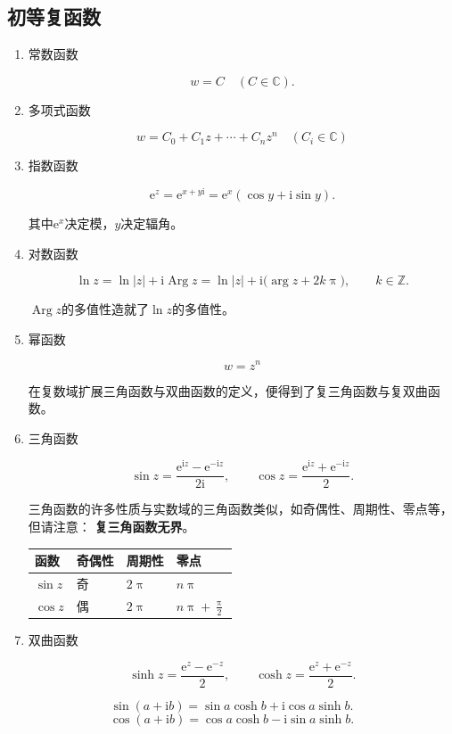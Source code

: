 \documentclass[UTF8,fontset=fandol,zihao=5]{ctexart}
\newcommand{\ii}{\mathrm{i}}
\newcommand{\ee}{\mathrm{e}}
\newcommand{\CC}{\mathbb{C}}
\begin{document}
\subsection{初等复函数}
\begin{enumerate}
  \item 常数函数

\[
  w=C\quad(C\in\CC).
\]

  \item 多项式函数

\[
  w=C_0+C_1z+\cdots+C_nz^n\quad(C_i\in\CC)
\]

  \item 指数函数  

\[
  \ee^z=\ee^{x+y\ii}=\ee^x(\cos y+\ii\sin y).
\]

其中$\ee^x$决定模，$y$决定辐角。

  \item 对数函数  

\[
\ln z
=\ln|z|+\ii\operatorname{Arg}z
=\ln|z|+\ii\bigl(\arg z+2k\uppi\bigr),
\qquad k\in\mathbb Z.
\]

$\operatorname{Arg}z$的多值性造就了$\ln z$的多值性。
  
  \item 幂函数  

\[
  w=z^n
\]

在复数域扩展三角函数与双曲函数的定义，便得到了复三角函数与复双曲函数。

  \item 三角函数  

\[
  \sin z=\frac{\ee^{\ii z}-\ee^{-\ii z}}{2\ii},
  \qquad
  \cos z=\frac{\ee^{\ii z}+\ee^{-\ii z}}{2}.
\]

三角函数的许多性质与实数域的三角函数类似，如奇偶性、周期性、零点等，但请注意：
\textbf{复三角函数无界}。

\begin{center}
\begin{tabularx}{0.88\textwidth}{>{\bfseries}p{2.2cm}X X X}
\toprule
函数 & 奇偶性 & 周期性 & 零点 \\
\midrule
\(\sin z\) & 奇 & $2\uppi$ & $n\uppi$ \\
\(\cos z\) & 偶 & $2\uppi$ & $n\uppi + \frac{\uppi}{2}$ \\
\bottomrule
\end{tabularx}
\end{center}

  \item 双曲函数

\[
\sinh z=\frac{\ee^z-\ee^{-z}}{2},
\qquad
\cosh z=\frac{\ee^z+\ee^{-z}}{2}.
\]
\end{enumerate}
\begin{methodbox}[【题型】计算复三角函数]
\[
\sin(a+\ii b)=\sin a\cosh b+\ii\cos a\sinh b.
\]
\[
\cos(a+\ii b)=\cos a\cosh b-\ii\sin a\sinh b.
\]
\end{methodbox}
\end{document}

